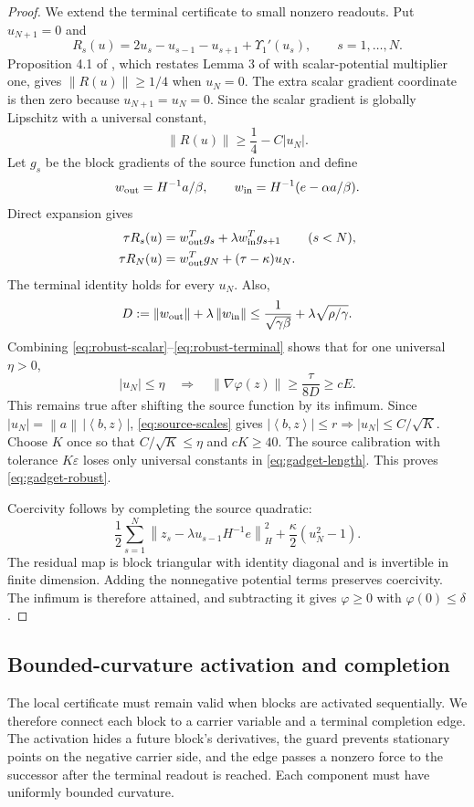 \documentclass[11pt]{article}
\theoremstyle{remark}
\theoremstyle{remark}
\newcommand{\eps}{\varepsilon}
\newcommand{\norm}[1]{\left\lVert#1\right\rVert}
\newcommand{\ip}[2]{\left\langle#1,#2\right\rangle}
\begin{document}
\begin{proof}
We extend the terminal certificate to small nonzero readouts. Put $u_{N+1}=0$ and
\[
 R_s(u)=2u_s-u_{s-1}-u_{s+1}+\Upsilon_1'(u_s),
 \qquad s=1,\ldots,N.
\]
Proposition 4.1 of \cite{zhou}, which restates Lemma 3 of \cite{carmon2} with scalar-potential multiplier one, gives $\norm{R(u)}\ge1/4$ when $u_N=0$. The extra scalar gradient coordinate is then zero because $u_{N+1}=u_N=0$. Since the scalar gradient is globally Lipschitz with a universal constant,
\begin{equation}\label{eq:robust-scalar}
 \norm{R(u)}\ge\frac14-C|u_N|.
\end{equation}
Let $g_s$ be the block gradients of the source function and define
\[
 w_{\rm out}=H^{-1}a/\beta,\qquad
 w_{\rm in}=H^{-1}(e-\alpha a/\beta).
\]
Direct expansion gives
\begin{align}
 \tau R_s(u)&=w_{\rm out}^Tg_s+\lambda w_{\rm in}^Tg_{s+1}
 &&(s<N),\label{eq:robust-projection}\\
 \tau R_N(u)&=w_{\rm out}^Tg_N+(\tau-\kappa)u_N.
 \label{eq:robust-terminal}
\end{align}
The terminal identity holds for every $u_N$.
Also,
\[
 D:=\norm{w_{\rm out}}+\lambda\norm{w_{\rm in}}
 \le\frac{1}{\sqrt{\gamma\beta}}+
       \lambda\sqrt{\rho/\gamma}.
\]
Combining \eqref{eq:robust-scalar}--\eqref{eq:robust-terminal} shows that for one universal $\eta>0$,
\[
 |u_N|\le\eta
 \quad\Longrightarrow\quad
 \norm{\nabla\varphi(z)}\ge\frac{\tau}{8D}\ge cE.
\]
This remains true after shifting the source function by its infimum. Since
$|u_N|=\norm a\,|\ip bz|$, \eqref{eq:source-scales} gives
$|\ip bz|\le r\Longrightarrow |u_N|\le C/\sqrt K$.
Choose $K$ once so that $C/\sqrt K\le\eta$ and $cK\ge40$.
The source calibration with tolerance $K\eps$ loses only universal constants in \eqref{eq:gadget-length}. This proves \eqref{eq:gadget-robust}.

Coercivity follows by completing the source quadratic:
\[
 \frac12\sum_{s=1}^N
 \norm{z_s-\lambda u_{s-1}H^{-1}e}_H^2
 +\frac\kappa2(u_N^2-1).
\]
The residual map is block triangular with identity diagonal and is invertible in finite dimension. Adding the nonnegative potential terms preserves coercivity. The infimum is therefore attained, and subtracting it gives $\varphi\ge0$ with $\varphi(0)\le\delta$.
\end{proof}

\subsection{Bounded-curvature activation and completion}
\label{sec:activation}
The local certificate must remain valid when blocks are activated sequentially. We therefore connect each block to a carrier variable and a terminal completion edge. The activation hides a future block's derivatives, the guard prevents stationary points on the negative carrier side, and the edge passes a nonzero force to the successor after the terminal readout is reached. Each component must have uniformly bounded curvature.
\end{document}

